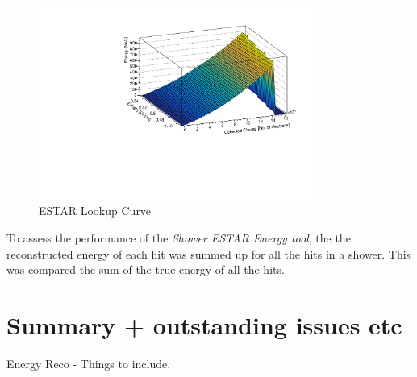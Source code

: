 \begin{figure}[hb]
    \centering
    \includegraphics[width = 0.8\textwidth]{figures-chap4/ESTAR_lookup_curve.pdf}
    \caption{ESTAR Lookup Curve}
    \label{fig:ESTAR lookup curve}
\end{figure}

To assess the performance of the \textit{Shower ESTAR Energy tool}, the the reconstructed energy of each hit was summed up for all the hits in a shower. This was compared the sum of the true energy of all the hits.


\section{Summary + outstanding issues etc}

Energy Reco - Things to include.


